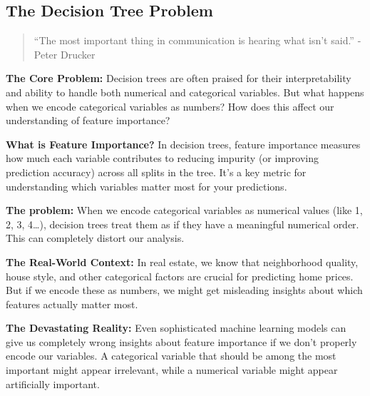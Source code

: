 \documentclass[
  letterpaper,
  DIV=11,
  numbers=noendperiod]{scrartcl}
\begin{document}
\subsection{The Decision Tree Problem
🎯}\label{the-decision-tree-problem}

\begin{quote}
``The most important thing in communication is hearing what isn't
said.'' - Peter Drucker
\end{quote}

\textbf{The Core Problem:} Decision trees are often praised for their
interpretability and ability to handle both numerical and categorical
variables. But what happens when we encode categorical variables as
numbers? How does this affect our understanding of feature importance?

\textbf{What is Feature Importance?} In decision trees, feature
importance measures how much each variable contributes to reducing
impurity (or improving prediction accuracy) across all splits in the
tree. It's a key metric for understanding which variables matter most
for your predictions.

\begin{tcolorbox}[enhanced jigsaw, colbacktitle=quarto-callout-important-color!10!white, toptitle=1mm, colframe=quarto-callout-important-color-frame, breakable, rightrule=.15mm, arc=.35mm, bottomtitle=1mm, titlerule=0mm, opacityback=0, title=\textcolor{quarto-callout-important-color}{\faExclamation}\hspace{0.5em}{🎯 The Key Insight: Encoding Matters for Interpretability}, colback=white, bottomrule=.15mm, toprule=.15mm, leftrule=.75mm, coltitle=black, opacitybacktitle=0.6, left=2mm]

\textbf{The problem:} When we encode categorical variables as numerical
values (like 1, 2, 3, 4\ldots), decision trees treat them as if they
have a meaningful numerical order. This can completely distort our
analysis.

\textbf{The Real-World Context:} In real estate, we know that
neighborhood quality, house style, and other categorical factors are
crucial for predicting home prices. But if we encode these as numbers,
we might get misleading insights about which features actually matter
most.

\textbf{The Devastating Reality:} Even sophisticated machine learning
models can give us completely wrong insights about feature importance if
we don't properly encode our variables. A categorical variable that
should be among the most important might appear irrelevant, while a
numerical variable might appear artificially important.

\end{tcolorbox}
\end{document}
